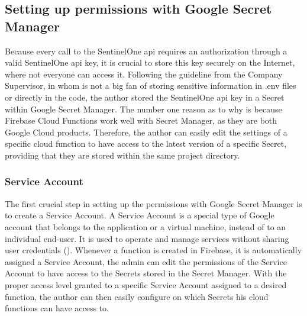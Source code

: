 \subsection{Setting up permissions with Google Secret Manager}

Because every call to the SentinelOne \acrshort{api} requires an authorization through a valid SentinelOne \acrshort{api} key, it is
crucial to store this key securely on the Internet, where not everyone can access it. Following the guideline from the Company
Supervisor, in whom is not a big fan of storing sensitive information in .env files or directly in the code, the author stored the
SentinelOne \acrshort{api} key in a Secret within Google Secret Manager. The number one reason as to why is because Firebase Cloud
Functions work well with Secret Manager, as they are both Google Cloud products. Therefore, the author can easily edit the settings of
a specific cloud function to have access to the latest version of a specific Secret, providing that they are stored within the same
project directory.

\subsubsection{Service Account}

The first crucial step in setting up the permissions with Google Secret Manager is to create a Service Account. A Service Account is
a special type of Google account that belongs to the application or a virtual machine, instead of to an individual end-user. It is
used to operate and manage services without sharing user credentials (\textit{\cite{serviceAccounts}}). Whenever a function is created
in Firebase, it is automatically assigned a Service Account, the admin can edit the permissions of the Service Account to have access
to the Secrets stored in the Secret Manager. With the proper access level granted to a specific Service Account assigned to a desired
function, the author can then easily configure on which Secrets his cloud functions can have access to.


